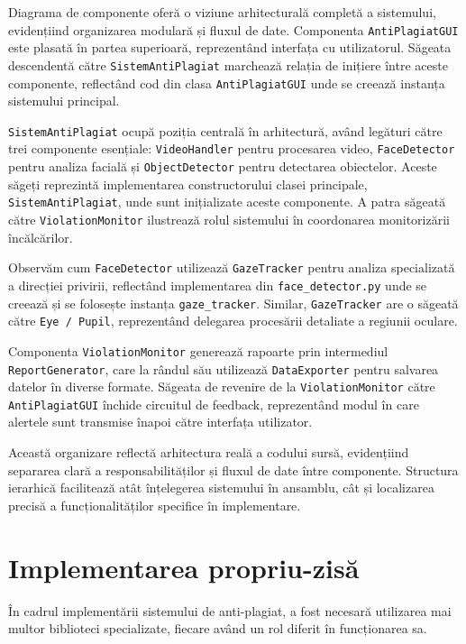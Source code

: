 \documentclass[12pt,a4paper]{article}
\begin{document}
Diagrama de componente oferă o viziune arhitecturală completă a sistemului, evidențiind organizarea modulară și fluxul de date. Componenta \texttt{AntiPlagiatGUI} este plasată în partea superioară, reprezentând interfața cu utilizatorul. Săgeata descendentă către \texttt{SistemAntiPlagiat} marchează relația de inițiere între aceste componente, reflectând cod din clasa \texttt{AntiPlagiatGUI} unde se creează instanța sistemului principal.

\texttt{SistemAntiPlagiat} ocupă poziția centrală în arhitectură, având legături către trei componente esențiale: \texttt{VideoHandler} pentru procesarea video, \texttt{FaceDetector} pentru analiza facială și \texttt{ObjectDetector} pentru detectarea obiectelor. Aceste săgeți reprezintă implementarea constructorului clasei principale, \texttt{SistemAntiPlagiat}, unde sunt inițializate aceste componente. A patra săgeată către \texttt{ViolationMonitor} ilustrează rolul sistemului în coordonarea monitorizării încălcărilor.

Observăm cum \texttt{FaceDetector} utilizează \texttt{GazeTracker} pentru analiza specializată a direcției privirii, reflectând implementarea din \texttt{face\_detector.py} unde se creează și se folosește instanța \texttt{gaze\_tracker}. Similar, \texttt{GazeTracker} are o săgeată către \texttt{Eye / Pupil}, reprezentând delegarea procesării detaliate a regiunii oculare.

Componenta \texttt{ViolationMonitor} generează rapoarte prin intermediul \texttt{ReportGenerator}, care la rândul său utilizează \texttt{DataExporter} pentru salvarea datelor în diverse formate. Săgeata de revenire de la \texttt{ViolationMonitor} către \texttt{AntiPlagiatGUI} închide circuitul de feedback, reprezentând modul în care alertele sunt transmise înapoi către interfața utilizator.

Această organizare reflectă arhitectura reală a codului sursă, evidențiind separarea clară a responsabilităților și fluxul de date între componente. Structura ierarhică facilitează atât înțelegerea sistemului în ansamblu, cât și localizarea precisă a funcționalităților specifice în implementare.

\section{Implementarea propriu-zisă}

În cadrul implementării sistemului de anti-plagiat, a fost necesară utilizarea mai multor biblioteci specializate, fiecare având un rol diferit în funcționarea sa.
\end{document}
